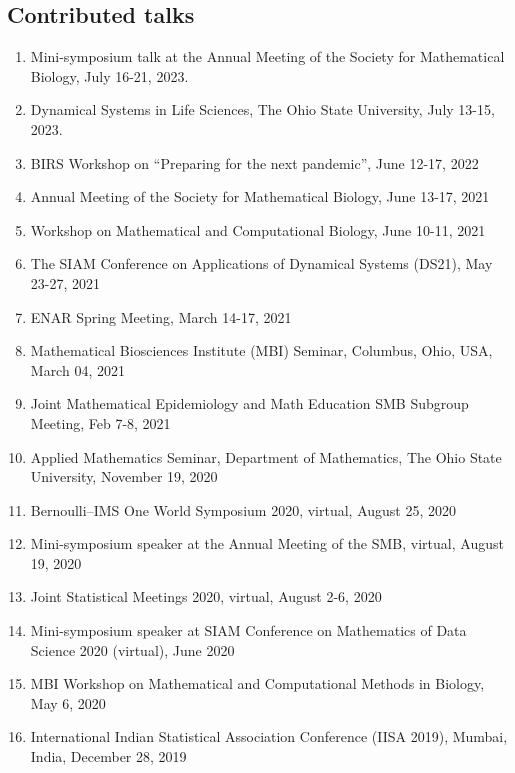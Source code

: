 \documentclass[11pt,a4paper,sans]{moderncv}        %
\begin{document}
\subsection{Contributed talks}
\begin{enumerate}
	\item Mini-symposium talk at the Annual Meeting of the Society for Mathematical Biology, July 16-21, 2023. 
	\item Dynamical Systems in Life Sciences, The Ohio State University, July 13-15, 2023.
	\item BIRS Workshop on ``Preparing for the next pandemic'', June 12-17, 2022
	\item Annual Meeting of the Society for Mathematical Biology, June 13-17, 2021
	\item Workshop on Mathematical and Computational Biology, June 10-11, 2021
	\item The SIAM Conference on Applications of Dynamical Systems (DS21), May 23-27, 2021
    \item ENAR Spring Meeting, March 14-17, 2021
	\item Mathematical Biosciences Institute (MBI) Seminar, Columbus, Ohio, USA, March 04, 2021
	\item Joint Mathematical Epidemiology and Math Education SMB Subgroup Meeting, Feb 7-8, 2021
	\item Applied Mathematics Seminar, Department of Mathematics, The Ohio State University, November 19, 2020 
	\item Bernoulli--IMS One World Symposium 2020, virtual, August 25, 2020
	\item Mini-symposium speaker at the Annual Meeting of the SMB, virtual, August 19, 2020
	\item Joint Statistical Meetings 2020, virtual, August 2-6, 2020
	\item {Mini-symposium speaker at SIAM Conference on Mathematics of Data Science 2020 (virtual), June 2020}
	\item {MBI Workshop on Mathematical and Computational Methods in Biology, May 6, 2020}
	\item {International Indian Statistical Association Conference (IISA 2019), Mumbai, India, December 28, 2019}

\end{enumerate}
\end{document}
